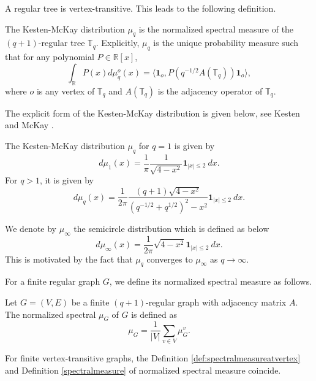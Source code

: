 \documentclass{article}
\begin{document}
A regular tree is vertex-transitive. This leads to the following definition.

\begin{definition}\label{kestenmckay}
    The Kesten-McKay distribution $\mu_q$ is the normalized spectral measure of the $(q+1)$-regular tree $\mathbb{T}_q$. Explicitly, $\mu_q$ is the unique probability measure such that for any polynomial $P \in \mathbb{R}[x]$, 
\begin{equation*}
    \int_\mathbb{R} P(x) d\mu_{q}^{o} (x)=\langle \mathbf{1}_{o}, P(q^{-1/2}A(\mathbb{T}_q)) \mathbf{1}_{o} \rangle,
\end{equation*}
where $o$ is any vertex of $\mathbb{T}_q$ and $A(\mathbb{T}_q)$ is the adjacency operator of $\mathbb{T}_q$.
\end{definition}

The explicit form of the Kesten-McKay distribution is given below, see Kesten \cite{Kes59} and McKay \cite{McK81}.
\begin{lemma}
The Kesten-McKay distribution $\mu_q$ for $q=1$ is given by 
\begin{equation*}
d\mu_{1}(x)=\frac{1}{\pi}\frac{1}{\sqrt{4-x^2}}\mathbf{1}_{|x|\leq 2}\ dx.
\end{equation*}
For $q>1$, it is given by 
    \begin{equation*}
    d\mu_{q}(x)=\frac{1}{2\pi}\frac{(q+1)\sqrt{4-x^2}}{ (q^{-1/2}+q^{1/2})^2-x^2}\mathbf{1}_{|x|\leq 2}\ dx.
    \end{equation*} 
\end{lemma}

We denote by $\mu_{\infty}$
the semicircle distribution which is defined as below
$$d\mu_{\infty}(x)=\frac{1}{2\pi}\sqrt{4-x^2}\mathbf{1}_{|x|\leq 2}\ dx.$$
This is motivated by the fact that $\mu_q$ converges to $\mu_{\infty}$ as $q\rightarrow \infty$.


For a finite regular graph $G$, we define its normalized spectral measure as follows.

\begin{definition}\label{spectralmeasure}
    Let $G=(V,E)$ be a finite $(q+1)$-regular graph with adjacency matrix $A$. The normalized spectral $\mu_G$ of $G$ is defined as 
    $$\mu_G=\frac{1}{|V|}\sum_{v\in V}\mu_G^{v}.$$
\end{definition}   
For finite vertex-transitive graphs, the Definition \ref{def:spectralmeasureatvertex} and Definition \ref{spectralmeasure} of normalized spectral measure coincide. 
\end{document}
